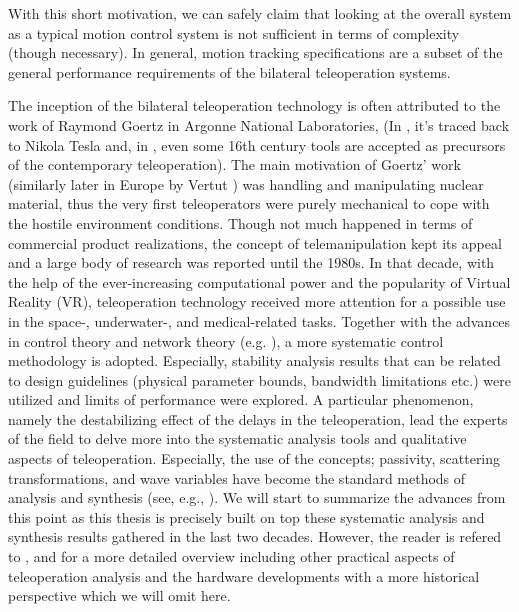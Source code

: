 With this short motivation, we can safely claim that looking at the overall system as a typical motion control 
system is not sufficient in terms of complexity (though necessary). In general, motion tracking specifications 
are a subset of the general performance requirements of the bilateral teleoperation systems. 



The inception of the bilateral teleoperation technology is often attributed to the work 
of Raymond Goertz in Argonne National Laboratories, \cite{goertz} (In \cite{basanezsuarez}, 
it's traced back to Nikola Tesla and, in \cite{sheridan89}, even some 16th century tools are accepted as precursors 
of the contemporary  teleoperation). The main motivation of Goertz' work (similarly later in Europe 
by Vertut \cite{vertutcoiffet}) was handling and manipulating nuclear material, thus the very 
first teleoperators were purely mechanical to cope with the hostile environment conditions. Though not much 
happened in terms of commercial product realizations, the concept of telemanipulation kept its appeal 
and a large body of research was reported until the 1980s. In that decade, with the help of the 
ever-increasing computational power and the popularity of Virtual Reality (VR), teleoperation 
technology received more attention for a possible use in the space-, underwater-, and medical-related 
tasks. Together with the advances in control theory and network theory (e.g. \cite{miyazaki,furuta}), 
a more systematic control methodology is adopted. Especially, stability analysis results that can be 
related to design guidelines (physical parameter bounds, bandwidth limitations etc.) were utilized
and limits of performance were explored. A particular phenomenon, namely the destabilizing effect 
of the delays in the teleoperation, lead the experts of the field to delve more into the systematic 
analysis tools and qualitative aspects of teleoperation. Especially, the use of the concepts; passivity, 
scattering transformations, and wave variables have become the standard methods of analysis and synthesis
(see, e.g., \cite{hannaford89,andersonspong,nieslotine}). We will start to summarize the advances from this 
point as this thesis is precisely built on top these systematic analysis and synthesis results gathered in 
the last two decades. However, the reader is refered to \cite{hokayemspong,burdea}, 
and \cite{sheridan89} for a more detailed overview including other practical aspects of teleoperation analysis and 
the hardware developments with a more historical perspective which we will omit here. 


